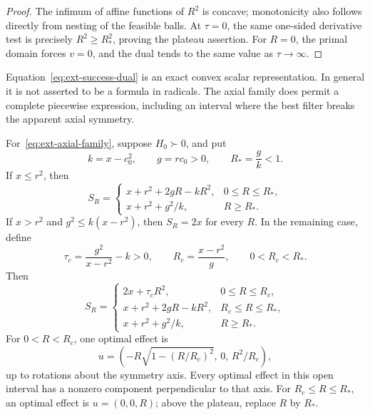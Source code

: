 \begin{proof}
The infimum of affine functions of $R^2$ is concave; monotonicity
also follows directly from nesting of the feasible balls.
At $\tau=0$, the same one-sided derivative test is precisely
$R^2\ge R_*^2$, proving the plateau assertion.
For $R=0$, the primal domain forces $v=0$, and the dual tends to
the same value as $\tau\to\infty$.
\end{proof}

Equation~\eqref{eq:ext-success-dual} is an exact convex scalar
representation. In general it is not asserted to be a formula in
radicals. The axial family does permit a complete piecewise expression,
including an interval where the best filter breaks the apparent axial
symmetry.

\begin{theorem}
\label{thm:ext-axial-frontier}
For~\eqref{eq:ext-axial-family}, suppose $H_0\succ0$, and put
\[
 k=x-c_0^2,\qquad g=rc_0>0,\qquad R_*=\frac gk<1.
\]
If $x\le r^2$, then
\begin{equation}
 S_R=
 \begin{cases}
  x+r^2+2gR-kR^2,&0\le R\le R_*,\\
  x+r^2+g^2/k,&R\ge R_*.
 \end{cases}
 \label{eq:ext-axial-frontier-first}
\end{equation}
If $x>r^2$ and $g^2\le k(x-r^2)$, then $S_R=2x$ for every $R$.
In the remaining case, define
\[
 \tau_c=\frac{g^2}{x-r^2}-k>0,\qquad
 R_c=\frac{x-r^2}{g},\qquad 0<R_c<R_*.
\]
Then
\begin{equation}
 \boxed{
 S_R=
 \begin{cases}
 2x+\tau_cR^2,&0\le R\le R_c,\\
 x+r^2+2gR-kR^2,&R_c\le R\le R_*,\\
 x+r^2+g^2/k,&R\ge R_*.
 \end{cases}}
 \label{eq:ext-axial-frontier}
\end{equation}
For $0<R<R_c$, one optimal effect is
\begin{equation}
 u=\left(-R\sqrt{1-(R/R_c)^2},\,0,\,R^2/R_c\right),
 \label{eq:ext-tilted-effect}
\end{equation}
up to rotations about the symmetry axis. Every optimal effect in this
open interval has a nonzero component perpendicular to that axis.
For $R_c\le R\le R_*$, an optimal effect is $u=(0,0,R)$; above
the plateau, replace $R$ by $R_*$.
\end{theorem}

